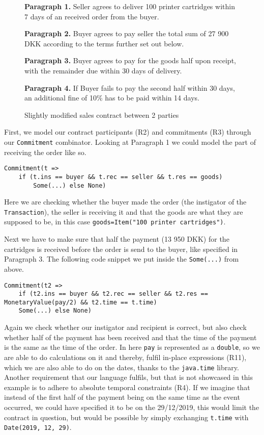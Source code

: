 \documentclass{ituthesis}
\begin{document}
\begin{figure}[!h]
    \centering
    \begin{tcolorbox}
        \textbf{Paragraph 1.} Seller agrees to deliver 100 printer cartridges within 7 days of an received order from the buyer.\par
        \textbf{Paragraph 2.} Buyer agrees to pay seller the total sum of 27 900 DKK according to the terms further set out below.\par
        \textbf{Paragraph 3.} Buyer agrees to pay for the goods half upon receipt, with the remainder due within
        30 days of delivery.\par
        \textbf{Paragraph 4.} If Buyer fails to pay the second half within 30 days, an additional fine of 10\% has
        to be paid within 14 days.\par
    \end{tcolorbox}
    \caption{Slightly modified sales contract between 2 parties \cite{hvitved2011contract}}
    \label{fig:contract}
\end{figure}

First, we model our contract participants (R2) and commitments (R3) through our \texttt{Commitment} combinator. Looking at Paragraph 1 we could model the part of receiving the order like so.
\begin{lstlisting}
Commitment(t => 
    if (t.ins == buyer && t.rec == seller && t.res == goods) 
        Some(...) else None)
\end{lstlisting}
Here we are checking whether the buyer made the order (the instigator of the \texttt{Transaction}), the seller is receiving it and that the goods are what they are supposed to be, in this case \texttt{goods=Item("100 printer cartridges")}. \par

Next we have to make sure that half the payment (13 950 DKK) for the cartridges is received before the order is send to the buyer, like specified in Paragraph 3. The following code snippet we put inside the \texttt{Some(...)} from above.
\begin{lstlisting}
Commitment(t2 =>
    if (t2.ins == buyer && t2.rec == seller && t2.res == MonetaryValue(pay/2) && t2.time == t.time)
    Some(...) else None)
\end{lstlisting}
Again we check whether our instigator and recipient is correct, but also check whether half of the payment has been received and that the time of the payment is the same as the time of the order. In here \texttt{pay} is represented as a \texttt{double}, so we are able to do calculations on it and thereby, fulfil in-place expressions (R11), which we are also able to do on the dates, thanks to the \texttt{java.time} library. Another requirement that our language fulfils, but that is not showcased in this example is to adhere to absolute temporal constraints (R4). If we imagine that instead of the first half of the payment being on the same time as the event occurred, we could have specified it to be on the 29/12/2019, this would limit the contract in question, but would be possible by simply exchanging \texttt{t.time} with \texttt{Date(2019, 12, 29)}.
\end{document}
